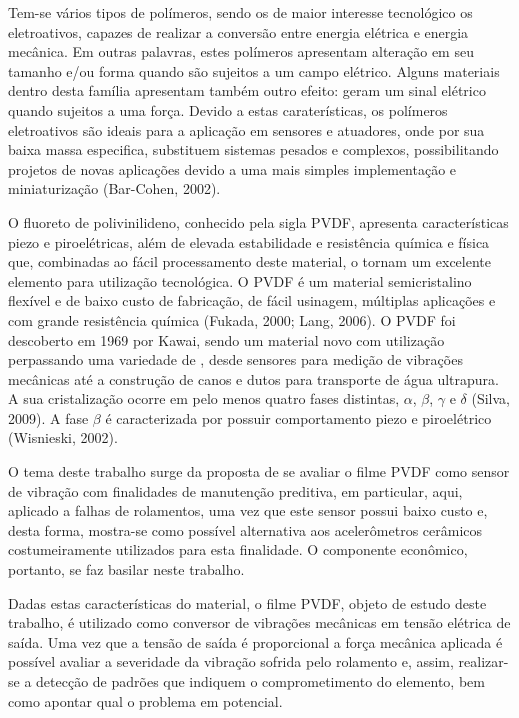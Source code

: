 \documentclass[
	12pt,				
	oneside,			
	a4paper,			
	english,			
	brazil				
	]{abntex2ppgsi}
\begin{document}
Tem-se vários tipos de polímeros, sendo os de maior interesse tecnológico os eletroativos, capazes de realizar a conversão entre energia elétrica e energia mecânica. Em outras palavras, estes polímeros apresentam alteração em seu tamanho e/ou forma quando são sujeitos a um campo elétrico. Alguns  materiais dentro desta família apresentam também outro efeito: geram um sinal elétrico quando sujeitos a uma força. Devido a estas caraterísticas, os polímeros eletroativos são ideais para a aplicação em sensores e atuadores, onde por sua baixa massa especifica, substituem sistemas pesados e complexos, possibilitando projetos de novas aplicações devido a uma mais simples implementação e miniaturização (Bar-Cohen, 2002).

O fluoreto de polivinilideno, conhecido pela sigla PVDF, apresenta características piezo e piroelétricas, além de elevada estabilidade e resistência química e física que, combinadas ao fácil processamento deste material, o tornam um excelente elemento para utilização tecnológica. O PVDF é um material semicristalino flexível e de baixo custo de fabricação, de fácil usinagem, múltiplas aplicações e com grande resistência química (Fukada, 2000; Lang, 2006). O PVDF foi descoberto em 1969 por Kawai, sendo um material novo com utilização perpassando uma variedade de , desde sensores para medição de vibrações mecânicas até a construção de canos e dutos para transporte de água ultrapura. A sua cristalização ocorre em pelo menos quatro fases distintas, $\alpha$, $\beta$, $\gamma$ e $\delta$ (Silva, 2009). A fase $\beta$ é caracterizada por possuir comportamento piezo e piroelétrico (Wisnieski, 2002).

O tema deste trabalho surge da proposta de se avaliar o filme PVDF como sensor de vibração com finalidades de manutenção preditiva, em particular, aqui, aplicado a falhas de rolamentos, uma vez que este sensor possui baixo custo e, desta forma, mostra-se como possível alternativa aos acelerômetros cerâmicos costumeiramente utilizados para esta finalidade. O componente econômico, portanto, se faz basilar neste trabalho. 

Dadas estas características do material, o filme PVDF, objeto de estudo deste trabalho, é utilizado como conversor de vibrações mecânicas em tensão elétrica de saída. Uma vez que a tensão de saída é proporcional a força mecânica aplicada é possível avaliar a severidade da vibração sofrida pelo rolamento e, assim, realizar-se a detecção de padrões que indiquem o comprometimento do elemento, bem como apontar qual o problema em potencial.
\end{document}
